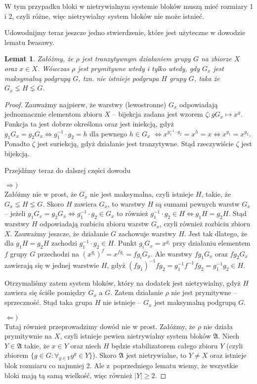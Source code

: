 \documentclass[licencjacka]{pracamgr}
\newtheorem{lemma}{Lemat}[section]
\begin{document}
W tym przypadku bloki w nietrywialnym systemie bloków muszą mieć rozmiary 1 i 2,
czyli różne, więc nietrywialny system bloków nie może istnieć.

Udowodnijmy teraz jeszcze jedno stwierdzenie, które jest użyteczne w dowodzie lematu Iwasawy.

\begin{lemma}\label{max_group}
	Załóżmy, że $\rho$ jest tranzytywnym działaniem grupy $G$ na zbiorze $X$ oraz $x \in X$.
	Wówczas $\rho$ jest prymitywne wtedy i tylko wtedy, gdy $G_x$ jest maksymalną podgrupą $G$, tzn.
	nie istnieje podgrupa $H$ grupy $G$, taka że $G_x \lneq H \lneq G$.
\end{lemma}
\begin{proof}
Zauważmy najpierw, że warstwy (lewostronne) $G_x$ odpowiadają jednoznacznie elementom zbioru $X$ --
bijekcja zadana jest wzorem $\zeta \colon g G_x \mapsto x^g$.
Funkcja ta jest dobrze określona oraz jest iniekcją, gdyż $g_1 G_x = g_2 G_x \iff g_1^{-1} \cdot g_2 = h$ dla pewnego $h \in G_x$
$\iff x^{g_1^{-1} \cdot g_2} = x^h = x \iff x^{g_1} = x^{g_2}$.
Ponadto $\zeta$ jest suriekcją, gdyż działanie jest tranzytywne.
Stąd rzeczywiście $\zeta$ jest bijekcją.

Przejdźmy teraz do dalszej części dowodu

$\Rightarrow)$ \\
Załóżmy nie w prost, że $G_x$ nie jest maksymalna, czyli istnieje $H$, takie, że $G_x \lneq H \lneq G$.
Skoro $H$ zawiera $G_x$, to warstwy $H$ są sumami pewnych warstw $G_x$ -- 
jeżeli $g_1 G_x = g_2 G_x \iff g_1^{-1} \cdot g_2 \in G_x$ to również $g_1^{-1} \cdot g_2 \in H \iff g_1 H = g_2 H$.
Stąd warstwy $H$ odpowiadają rozbiciu zbioru warstw $G_x$, czyli również rozbiciu zbioru $X$.
Zauważmy jeszcze, że działanie $G$ zachowuje warstwy $H$.
Jest tak dlatego, że dla $g_1 H = g_2 H$ zachodzi $g_1^{-1} \cdot g_2 \in H$.
Punkt $g_i G_x = x^{g_i}$ przy działaniu elementem $f$ grupy $G$ przechodzi na $(x^{g_i})^f = x^{f g_i} = f g_i G_x$.
Ale warstwy $f g_1 G_x$ oraz $f g_2 G_x$ zawierają się w jednej warstwie $H$, gdyż $(f g_1)^{-1} f g_2 = g_1^{-1} f^{-1} f g_2 = g_1^{-1} g_2 \in H$.

Otrzymaliśmy zatem system bloków, który na dodatek jest nietrywialny, gdyż $H$ zawiera się ściśle pomiędzy $G_x$ a $G$.
Zatem działanie $\rho$ nie jest prymitywne -- sprzeczność.
Stąd taka grupa $H$ nie istnieje -- $G_x$ jest maksymalną podgrupą $G$.

$\Leftarrow)$ \\
Tutaj również przeprowadzimy dowód nie w prost.
Załóżmy, że $\rho$ nie działa prymitywnie na $X$, czyli istnieje pewien nietrywialny system bloków $\mathfrak{A}$.
Niech $Y \in \mathfrak{A}$ takie, że $x \in Y$ oraz niech $H$ będzie stabilizatorem całego zbioru $Y$
(czyli zbiorem $\{g \in G \colon \forall_{y \in Y} y^g \in Y \}$).
Skoro $\mathfrak{A}$ jest nietrywialne, to $Y \ne X$ oraz istnieje blok rozmiaru co najmniej 2.
Ale z~poprzedniego lematu wiemy, że wszystkie bloki mają tą samą wielkość, więc również $|Y| \ge 2$.


\end{proof}
\end{document}

